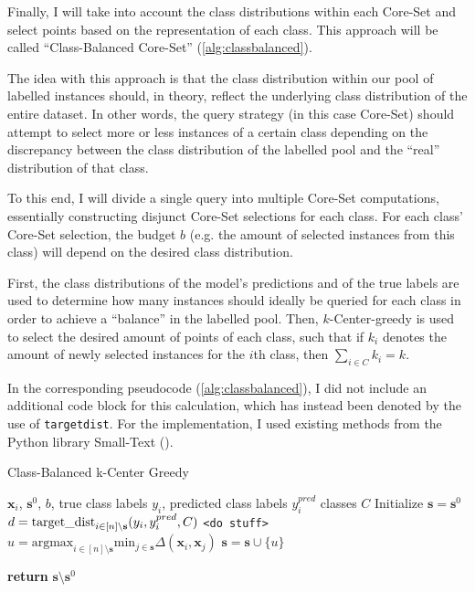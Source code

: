 \documentclass[english,bachelor,ul]{webisthesis} %
\begin{document}
Finally, I will take into account the class distributions within each Core-Set and select points based on the representation of each class. This approach will be called ``Class-Balanced Core-Set'' (\ref{alg:classbalanced}).

The idea with this approach is that the class distribution within our pool of labelled instances should, in theory, reflect the underlying class distribution of the entire dataset. In other words, the query strategy (in this case Core-Set) should attempt to select more or less instances of a certain class depending on the discrepancy between the class distribution of the labelled pool and the ``real'' distribution of that class.

To this end, I will divide a single query into multiple Core-Set computations, essentially constructing disjunct Core-Set selections for each class. For each class' Core-Set selection, the budget $ b $ (e.g. the amount of selected instances from this class) will depend on the desired class distribution.

First, the class distributions of the model's predictions and of the true labels are used to determine how many instances should ideally be queried for each class in order to achieve a ``balance'' in the labelled pool. Then, $k$-Center-greedy is used to select the desired amount of points of each class, such that if $ k_i $ denotes the amount of newly selected instances for the $ i $th class, then $ \sum_{i \in C} k_i = k $. 

In the corresponding pseudocode (\ref{alg:classbalanced}), I did not include an additional code block for this calculation, which has instead been denoted by the use of \texttt{target\textunderscore dist}. For the implementation, I used existing methods from the Python library Small-Text (\cite{schroeder2023small-text}).

\begin{algorithm}
    \caption{Class-Balanced k-Center Greedy}%
\makeatletter{}\makeatother
\label{alg:classbalanced}
\begin{algorithmic}

\Require $ \mathbf{x}_i $, $ \mathbf{s}^0 $, $ b $, true class labels $ y_i $, predicted class labels $ y^{pred}_i $ classes $ C $
\State Initialize $ \mathbf{s} = \mathbf{s}^0 $
\State $ d = \text{target\textunderscore dist}_{i \in [n] \setminus \mathbf{s}} (y_i, y^{pred}_i, C) $
\State \texttt{<do stuff>}
\EndFor
\Repeat
\State $ u = \text{argmax}_{i \in [n] \setminus \mathbf{s}} \text{min}_{j \in \mathbf{s}} \Delta(\mathbf{x}_i, \mathbf{x}_j) $
\State $ \mathbf{s} = \mathbf{s} \cup \{u\} $

\State \textbf{return} $\mathbf{s} \setminus \mathbf{s}^0 $
\end{algorithmic}
\end{algorithm}
\end{document}
